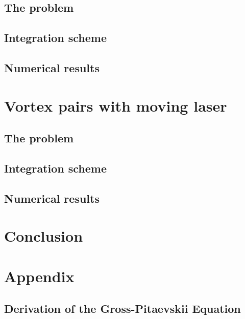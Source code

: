 \documentclass{article}
\begin{document}
\subsection{The problem}
\subsection{Integration scheme}
\subsection{Numerical results}

\section{Vortex pairs with moving laser}\label{sec:Vortex}
\subsection{The problem}
\subsection{Integration scheme}
\subsection{Numerical results}

\section{Conclusion}\label{sec:Conc}


\newpage
\section*{Appendix}\label{sec:Appendix}

\subsection*{Derivation of the Gross-Pitaevskii Equation}
\end{document}
